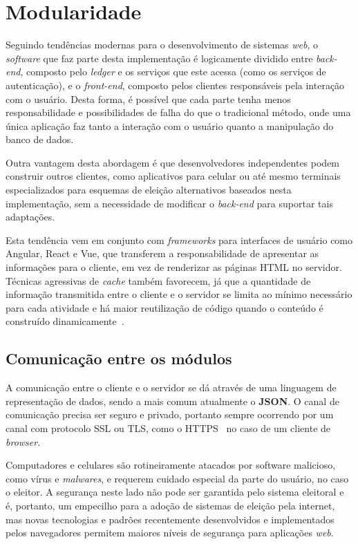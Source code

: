\section{Modularidade}

Seguindo tendências modernas para o desenvolvimento de sistemas \textit{web}, o
\textit{software} que faz parte desta implementação é logicamente dividido
entre \textit{back-end}, composto pelo \textit{ledger} e os serviços que este
acessa (como os serviços de autenticação), e o \textit{front-end}, composto
pelos clientes responsáveis pela interação com o usuário. Desta forma, é
possível que cada parte tenha menos responsabilidade e possibilidades de falha
do que o tradicional método, onde uma única aplicação faz tanto a interação com
o usuário quanto a manipulação do banco de dados.

Outra vantagem desta abordagem é que desenvolvedores independentes podem
construir outros clientes, como aplicativos para celular ou até mesmo terminais
especializados para esquemas de eleição alternativos baseados nesta
implementação, sem a necessidade de modificar o \textit{back-end} para suportar
tais adaptações.

Esta tendência vem em conjunto com \textit{frameworks} para interfaces de
usuário como Angular, React e Vue, que transferem a responsabilidade de
apresentar as informações para o cliente, em vez de renderizar as páginas HTML
no servidor. Técnicas agressivas de \textit{cache} também favorecem, já que a
quantidade de informação transmitida entre o cliente e o servidor se limita ao
mínimo necessário para cada atividade e há maior reutilização de código quando
o conteúdo é construído dinamicamente~\cite{souders2008high}.

\subsection{Comunicação entre os módulos}

A comunicação entre o cliente e o servidor se dá através de uma linguagem de
representação de dados, sendo a mais comum atualmente o \textbf{JSON}. O canal
de comunicação precisa ser seguro e privado, portanto sempre ocorrendo por um
canal com protocolo SSL ou TLS, como o HTTPS~\cite{rfc2818} no caso de um
cliente de \textit{browser}.

Computadores e celulares são rotineiramente atacados por software malicioso,
como vírus e \textit{malwares}, e requerem cuidado especial da parte do
usuário, no caso o eleitor. A segurança neste lado não pode ser garantida pelo
sistema eleitoral e é, portanto, um empecilho para a adoção de sistemas de
eleição pela internet, mas novas tecnologias e padrões recentemente
desenvolvidos e implementados pelos navegadores permitem maiores níveis de
segurança para aplicações \textit{web}.

